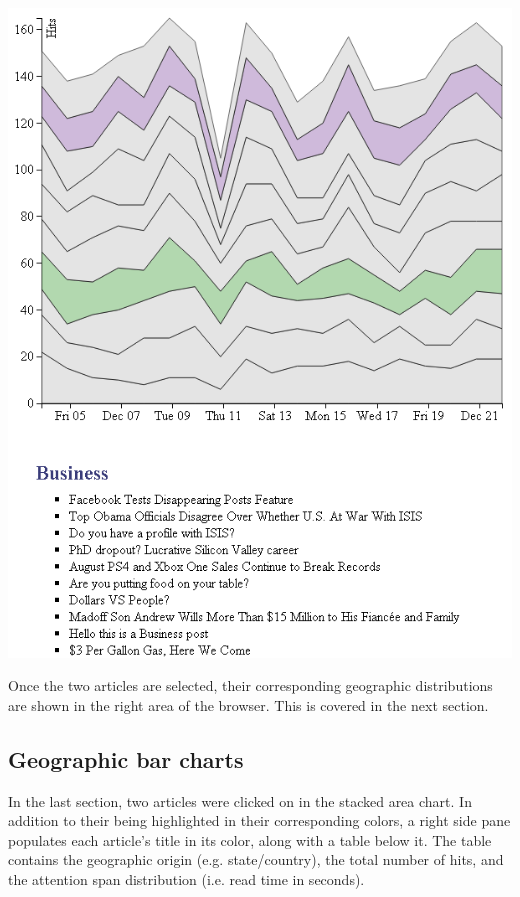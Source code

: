 \documentclass[12pt]{article}
\begin{document}
\noindent\includegraphics[scale=0.9]{img/viz_7}

\noindent Once the two articles are selected, their corresponding geographic distributions are shown in the right area of the browser. This is covered in the next section. 

\subsection{Geographic bar charts}

In the last section, two articles were clicked on in the stacked area chart. In addition to their being highlighted in their corresponding colors, a right side pane populates each article's title in its color, along with a table below it. The table contains the geographic origin (e.g. state/country), the total number of hits, and the attention span distribution (i.e. read time in seconds).
\end{document}
